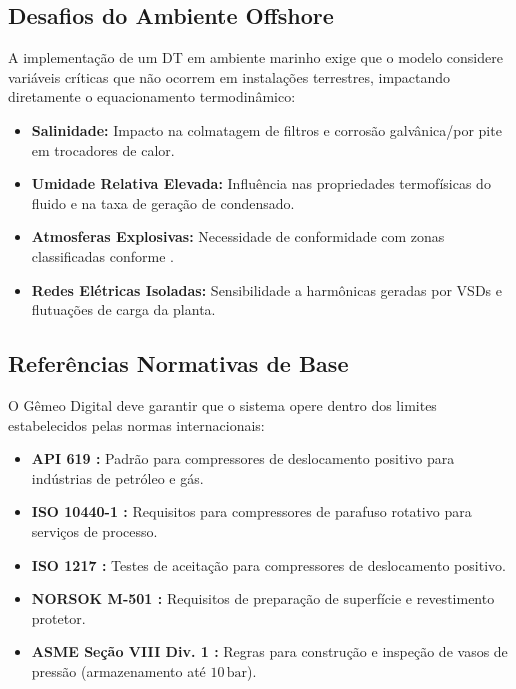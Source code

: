 \documentclass[12pt,a4paper]{article}
\numberwithin{equation}{section}
\numberwithin{table}{section}
\numberwithin{figure}{section}
\begin{document}
	\subsection{\textbf{Desafios do Ambiente Offshore}}
	A implementação de um DT em ambiente marinho exige que o modelo considere variáveis críticas que não ocorrem em instalações terrestres, impactando diretamente o equacionamento termodinâmico:
	
	\begin{itemize}
		\item \textbf{Salinidade:} Impacto na colmatagem de filtros e corrosão galvânica/por pite em trocadores de calor.
		\item \textbf{Umidade Relativa Elevada:} Influência nas propriedades termofísicas do fluido e na taxa de geração de condensado.
		\item \textbf{Atmosferas Explosivas:} Necessidade de conformidade com zonas classificadas conforme  \cite{iec60079}.
		\item \textbf{Redes Elétricas Isoladas:} Sensibilidade a harmônicas geradas por VSDs e flutuações de carga da planta.
	\end{itemize}
	
	\subsection{\textbf{Referências Normativas de Base}}
	O Gêmeo Digital deve garantir que o sistema opere dentro dos limites estabelecidos pelas normas internacionais:
	
	\begin{itemize}
		\item \textbf{API 619 \cite{api619}:} Padrão para compressores de deslocamento positivo para indústrias de petróleo e gás.
		\item \textbf{ISO 10440-1 \cite{iso10440}:} Requisitos para compressores de parafuso rotativo para serviços de processo.
		\item \textbf{ISO 1217 \cite{iso1217}:} Testes de aceitação para compressores de deslocamento positivo.
		\item \textbf{NORSOK M-501 \cite{norsok}:} Requisitos de preparação de superfície e revestimento protetor.
		\item \textbf{ASME Seção VIII Div. 1 \cite{asme8}:} Regras para construção e inspeção de vasos de pressão (armazenamento até $10\,\text{bar}$).
	\end{itemize}
	
\end{document}
